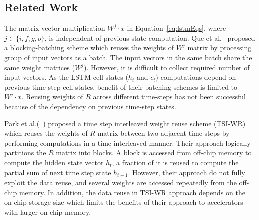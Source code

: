 \documentclass[a4paper,10pt]{article}
\begin{document}
\subsection{Related Work}
The matrix-vector multiplication $W^j\cdot x$ in Equation~\eqref{eq:lstmEqs}, where $j\in \{i,f,g,o\}$, is independent of previous state computation. Que et al.~\cite{que2019efficient} proposed a blocking-batching scheme which reuses the weights of $W^j$ matrix by processing group of input vectors as a batch. The input vectors in the same batch share the same weight matrices ($W^j$). However, it is difficult to collect required number of input vectors. As the LSTM cell states ($h_t$ and $c_t$) computations depend on previous time-step cell states, benefit of their batching schemes is limited to $W^j\cdot x$. Reusing weights of $R$ across different time-steps has not been successful because of the dependency on previous time-step states.

Park et al.(~\cite{park2020time}) proposed a time step interleaved weight reuse scheme (TSI-WR) which reuses the weights of $R$ matrix between two adjacent time steps by performing computations in a time-interleaved manner. Their approach logically partitions the $R$ matrix into blocks. A block is accessed from off-chip memory to compute the hidden state vector $h_t$, a fraction of it is reused to compute the partial sum of next time step state $h_{t+1}$. However, their approach do not fully exploit the data reuse, and several weights are accessed repeatedly from the off-chip memory. In addition, the data reuse in TSI-WR approach depends on the on-chip storage size which limits the benefits of their approach to accelerators with larger on-chip memory.
\end{document}
